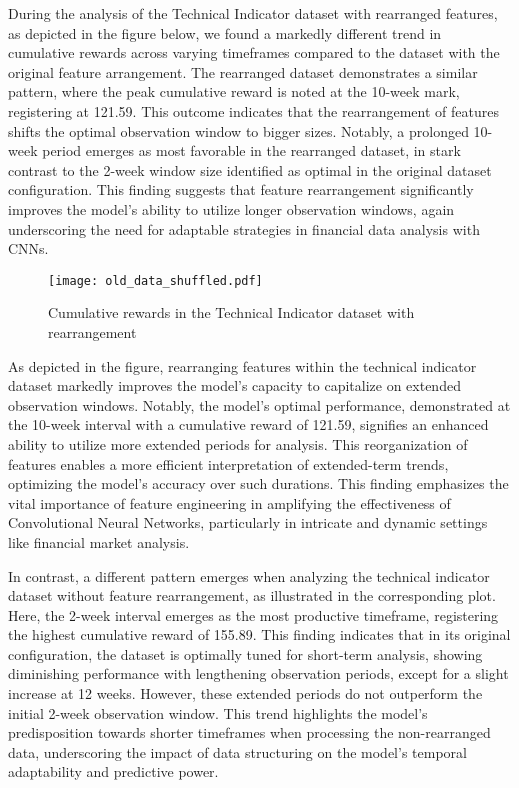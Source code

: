 During the analysis of the Technical Indicator dataset with rearranged features, as depicted in the figure below, we found a markedly different trend in cumulative rewards across varying timeframes compared to the dataset with the original feature arrangement. The rearranged dataset demonstrates a similar pattern, where the peak cumulative reward is noted at the 10-week mark, registering at 121.59. This outcome indicates that the rearrangement of features shifts the optimal observation window to bigger sizes. Notably, a prolonged 10-week period emerges as most favorable in the rearranged dataset, in stark contrast to the 2-week window size identified as optimal in the original dataset configuration. This finding suggests that feature rearrangement significantly improves the model's ability to utilize longer observation windows, again underscoring the need for adaptable strategies in financial data analysis with CNNs.

\begin{figure}[ht]
    \centering
    \texttt{[image: old\_data\_shuffled.pdf]}
    \caption{Cumulative rewards in the Technical Indicator dataset with rearrangement }
    \label{fig:tech_indicator_rearranged}
\end{figure}

As depicted in the figure, rearranging features within the technical indicator dataset markedly improves the model's capacity to capitalize on extended observation windows. Notably, the model's optimal performance, demonstrated at the 10-week interval with a cumulative reward of 121.59, signifies an enhanced ability to utilize more extended periods for analysis. This reorganization of features enables a more efficient interpretation of extended-term trends, optimizing the model's accuracy over such durations. This finding emphasizes the vital importance of feature engineering in amplifying the effectiveness of Convolutional Neural Networks, particularly in intricate and dynamic settings like financial market analysis.

In contrast, a different pattern emerges when analyzing the technical indicator dataset without feature rearrangement, as illustrated in the corresponding plot. Here, the 2-week interval emerges as the most productive timeframe, registering the highest cumulative reward of 155.89. This finding indicates that in its original configuration, the dataset is optimally tuned for short-term analysis, showing diminishing performance with lengthening observation periods, except for a slight increase at 12 weeks. However, these extended periods do not outperform the initial 2-week observation window. This trend highlights the model's predisposition towards shorter timeframes when processing the non-rearranged data, underscoring the impact of data structuring on the model's temporal adaptability and predictive power.

